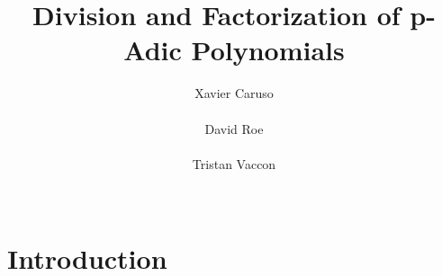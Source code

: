 \documentclass{sig-alternate-2013}
\newcommand{\RS}{\text{\rm RS}}
\begin{document}
\newtheorem{theo}{Theorem}[section]
\newtheorem{lem}[theo]{Lemma}
\newtheorem{prop}[theo]{Proposition}
\newtheorem{cor}[theo]{Corollary}
\newtheorem{quest}[theo]{Question}
\newtheorem{conj}[theo]{Conjecture}
\theoremstyle{definition}
\newtheorem{rem}[theo]{Remark}
\newtheorem{ex}[theo]{Example}
\newtheorem{deftn}[theo]{Definition}

\title{Division and Factorization of p-Adic Polynomials}

\author{
\alignauthor Xavier Caruso\\
  \\
\alignauthor David Roe \\
  \\
\alignauthor Tristan Vaccon\\
  \\
}

\maketitle

\begin{abstract}
\end{abstract}

\keywords{}

%
%

\section{Introduction}
\end{document}
